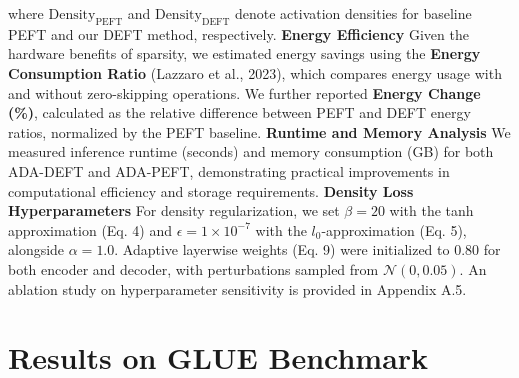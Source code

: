 \documentclass[11pt,a4paper]{article}
\begin{document}
where \(\text{Density}_{\text{PEFT}}\) and \(\text{Density}_{\text{DEFT}}\) denote activation densities for baseline PEFT and our DEFT method, respectively. \textbf{Energy Efficiency} Given the hardware benefits of sparsity, we estimated energy savings using the \textbf{Energy Consumption Ratio} (Lazzaro et al., 2023), which compares energy usage with and without zero-skipping operations. We further reported \textbf{Energy Change (\%)}, calculated as the relative difference between PEFT and DEFT energy ratios, normalized by the PEFT baseline. \textbf{Runtime and Memory Analysis} We measured inference runtime (seconds) and memory consumption (GB) for both ADA-DEFT and ADA-PEFT, demonstrating practical improvements in computational efficiency and storage requirements. \textbf{Density Loss Hyperparameters} For density regularization, we set \(\beta = 20\) with the tanh approximation (Eq. 4) and \(\epsilon = 1 \times 10^{-7}\) with the \(l_0\)-approximation (Eq. 5), alongside \(\alpha = 1.0\). Adaptive layerwise weights (Eq. 9) were initialized to 0.80 for both encoder and decoder, with perturbations sampled from \(\mathcal{N}(0, 0.05)\). An ablation study on hyperparameter sensitivity is provided in Appendix A.5.




\section{Results on GLUE Benchmark}
\end{document}
